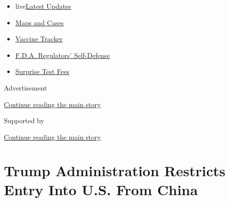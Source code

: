 \begin{itemize}
\tightlist
\item
  live\href{https://www.nytimes3xbfgragh.onion/2020/09/11/world/covid-19-coronavirus.html?name=styln-coronavirus-markets\&region=TOP_BANNER\&block=storyline_menu_recirc\&action=click\&pgtype=Article\&impression_id=4e3fafc0-f4c6-11ea-886e-25385b9a717d\&variant=undefined}{Latest
  Updates}
\item
  \href{https://www.nytimes3xbfgragh.onion/interactive/2020/us/coronavirus-us-cases.html?name=styln-coronavirus-markets\&region=TOP_BANNER\&block=storyline_menu_recirc\&action=click\&pgtype=Article\&impression_id=4e468d90-f4c6-11ea-886e-25385b9a717d\&variant=undefined}{Maps
  and Cases}
\item
  \href{https://www.nytimes3xbfgragh.onion/interactive/2020/science/coronavirus-vaccine-tracker.html?name=styln-coronavirus-markets\&region=TOP_BANNER\&block=storyline_menu_recirc\&action=click\&pgtype=Article\&impression_id=4e468d91-f4c6-11ea-886e-25385b9a717d\&variant=undefined}{Vaccine
  Tracker}
\item
  \href{https://www.nytimes3xbfgragh.onion/2020/09/10/us/politics/fda-coronavirus-vaccine.html?name=styln-coronavirus-markets\&region=TOP_BANNER\&block=storyline_menu_recirc\&action=click\&pgtype=Article\&impression_id=4e468d92-f4c6-11ea-886e-25385b9a717d\&variant=undefined}{F.D.A.
  Regulators' Self-Defense}
\item
  \href{https://www.nytimes3xbfgragh.onion/2020/09/09/upshot/coronavirus-surprise-test-fees.html?name=styln-coronavirus-markets\&region=TOP_BANNER\&block=storyline_menu_recirc\&action=click\&pgtype=Article\&impression_id=4e46b4a0-f4c6-11ea-886e-25385b9a717d\&variant=undefined}{Surprise
  Test Fees}
\end{itemize}

Advertisement

\protect\hyperlink{after-top}{Continue reading the main story}

Supported by

\protect\hyperlink{after-sponsor}{Continue reading the main story}

\hypertarget{trump-administration-restricts-entry-into-us-from-china}{%
\section{Trump Administration Restricts Entry Into U.S. From
China}\label{trump-administration-restricts-entry-into-us-from-china}}

